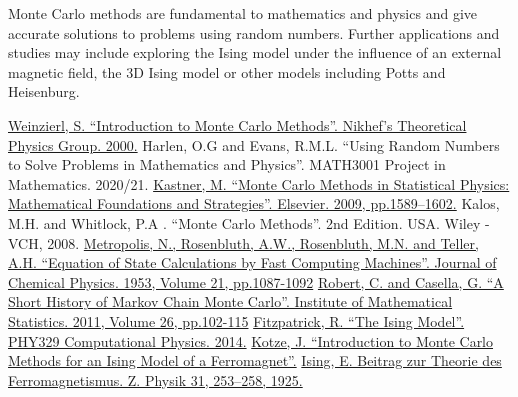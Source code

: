 \documentclass[a4paper]{article}
\begin{document}
Monte Carlo methods are fundamental to mathematics and physics and give accurate solutions to problems using random numbers. Further applications and studies may include exploring the Ising model under the influence of an external magnetic field, the 3D Ising model or other models including Potts and Heisenburg. 

\begin{thebibliography}{5}
\href{https://arxiv.org/pdf/hep-ph/0006269.pdf}{Weinzierl, S. “Introduction to Monte Carlo Methods”. Nikhef's Theoretical Physics Group. 2000.}
 Harlen, O.G and Evans, R.M.L. “Using Random Numbers to Solve Problems in Mathematics and Physics”. MATH3001 Project in Mathematics. 2020/21.
 \href{https://reader.elsevier.com/reader/sd/pii/S1007570409003517?token=5C265B5A35134BF073C921936D14B965297B5F00FF3AD6194363AD5D2764B57E4814ED5B647AAE9FBBC7C44F5601547E}{Kastner, M. “Monte Carlo Methods in Statistical Physics: Mathematical Foundations and Strategies”. Elsevier. 2009, pp.1589–1602.}
 Kalos, M.H. and Whitlock, P.A . “Monte Carlo Methods”. 2nd Edition. USA. Wiley - VCH, 2008.
\href{https://bayes.wustl.edu/Manual/EquationOfState.pdf}{Metropolis, N., Rosenbluth, A.W., Rosenbluth, M.N. and Teller, A.H. “Equation of State Calculations by Fast Computing Machines”. Journal of Chemical Physics. 1953, Volume 21, pp.1087-1092}
\href{https://arxiv.org/pdf/0808.2902.pdf}{Robert, C. and Casella, G. “A Short History of Markov Chain Monte Carlo”. Institute of Mathematical Statistics. 2011, Volume 26, pp.102-115}
\href{http://farside.ph.utexas.edu/teaching/329/lectures}{Fitzpatrick, R. “The Ising Model”. PHY329 Computational Physics. 2014.}
 \href{https://arxiv.org/pdf/0803.0217.pdf}{Kotze, J. “Introduction to Monte Carlo Methods for an Ising Model of a Ferromagnet”.}
 \href{https://link.springer.com/article/10.1007/BF02980577}{Ising, E. Beitrag zur Theorie des Ferromagnetismus. Z. Physik 31, 253–258, 1925.}
\end{thebibliography}
\end{document}
